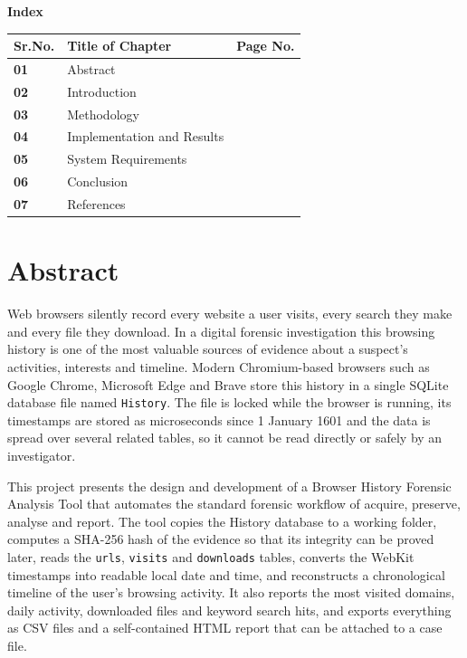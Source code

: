 \documentclass[12pt,a4paper]{article}
\begin{document}
\thispagestyle{empty}
\vspace*{3cm}
\begin{center}
{\Large\bfseries Index}\\[0.8cm]
\renewcommand{\arraystretch}{2}
\begin{tabular}{|>{\centering\arraybackslash}p{2cm}|>{\centering\arraybackslash}p{8cm}|>{\centering\arraybackslash}p{2.5cm}|}
\hline
\textbf{Sr.No.} & \textbf{Title of Chapter} & \textbf{Page No.}\\ \hline
\textbf{01} & Abstract & \pageref{sec:abstract}\\ \hline
\textbf{02} & Introduction & \pageref{sec:intro}\\ \hline
\textbf{03} & Methodology & \pageref{sec:method}\\ \hline
\textbf{04} & Implementation and Results & \pageref{sec:impl}\\ \hline
\textbf{05} & System Requirements & \pageref{sec:req}\\ \hline
\textbf{06} & Conclusion & \pageref{sec:concl}\\ \hline
\textbf{07} & References & \pageref{sec:ref}\\ \hline
\end{tabular}
\end{center}
\newpage
\setcounter{page}{5}

\section*{Abstract}\label{sec:abstract}
Web browsers silently record every website a user visits, every search they make and every file they download. In a digital forensic investigation this browsing history is one of the most valuable sources of evidence about a suspect's activities, interests and timeline. Modern Chromium-based browsers such as Google Chrome, Microsoft Edge and Brave store this history in a single SQLite database file named \texttt{History}. The file is locked while the browser is running, its timestamps are stored as microseconds since 1 January 1601 and the data is spread over several related tables, so it cannot be read directly or safely by an investigator.

This project presents the design and development of a Browser History Forensic Analysis Tool that automates the standard forensic workflow of acquire, preserve, analyse and report. The tool copies the History database to a working folder, computes a SHA-256 hash of the evidence so that its integrity can be proved later, reads the \texttt{urls}, \texttt{visits} and \texttt{downloads} tables, converts the WebKit timestamps into readable local date and time, and reconstructs a chronological timeline of the user's browsing activity. It also reports the most visited domains, daily activity, downloaded files and keyword search hits, and exports everything as CSV files and a self-contained HTML report that can be attached to a case file.
\end{document}
